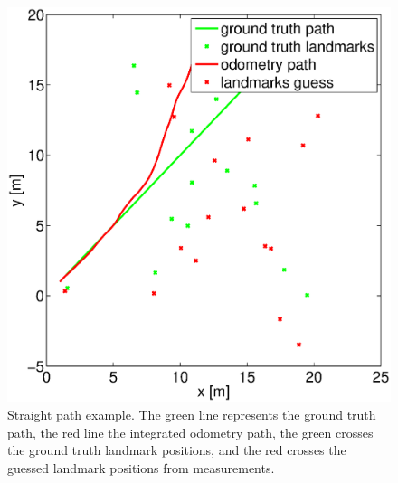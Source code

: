 \begin{figure}[t]
\centering
\includegraphics[width=\columnwidth]{fig/straight-path.eps}
\caption{Straight path example. The green line represents the ground truth
  path, the red line the integrated odometry path, the green crosses the ground
  truth landmark positions, and the red crosses the guessed landmark positions
  from measurements.}
\label{fig:straight-path}
\end{figure}

